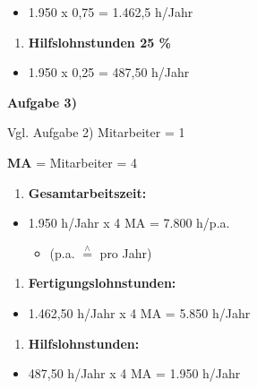 \begin{itemize}
\item
  1.950 x 0,75 = 1.462,5 h/Jahr
\end{itemize}

\begin{enumerate}
\def\labelenumi{\alph{enumi})}
\setcounter{enumi}{2}
\item
  \textbf{Hilfslohnstunden 25 \%}
\end{enumerate}

\begin{itemize}
\item
  1.950 x 0,25 = 487,50 h/Jahr
\end{itemize}

\textbf{Aufgabe 3)}

Vgl. Aufgabe 2) Mitarbeiter = 1

\textbf{MA} = Mitarbeiter = 4

\begin{enumerate}
\def\labelenumi{\alph{enumi})}
\item
  \textbf{Gesamtarbeitszeit:}
\end{enumerate}

\begin{itemize}
\item
  1.950 h/Jahr x 4 MA = 7.800 h/p.a.

  \begin{itemize}
  \item
    (p.a. $\stackrel{\wedge}=$ pro Jahr)
  \end{itemize}
\end{itemize}

\begin{enumerate}
\def\labelenumi{\alph{enumi})}
\setcounter{enumi}{1}
\item
  \textbf{Fertigungslohnstunden:}
\end{enumerate}

\begin{itemize}
\item
  1.462,50 h/Jahr x 4 MA = 5.850 h/Jahr
\end{itemize}

\begin{enumerate}
\def\labelenumi{\alph{enumi})}
\setcounter{enumi}{2}
\item
  \textbf{Hilfslohnstunden:}
\end{enumerate}

\begin{itemize}
\item
  487,50 h/Jahr x 4 MA = 1.950 h/Jahr
\end{itemize}
